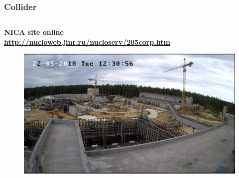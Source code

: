 \documentclass[dvipsnames] {beamer}
\begin{document}
\begin{frame}
  \bf
  \frametitle{\bf \centering Collider}
  \begin{columns}[c]
    \begin{block}{\bf \centering NICA site online \\ \url{http://nucloweb.jinr.ru/nucloserv/205corp.htm}}
      \begin{figure}[H]
        \includegraphics[width=1.\linewidth]{collider_online.png} 
      \end{figure}
    \end{block}


\end{columns}
\end{frame}
\end{document}
